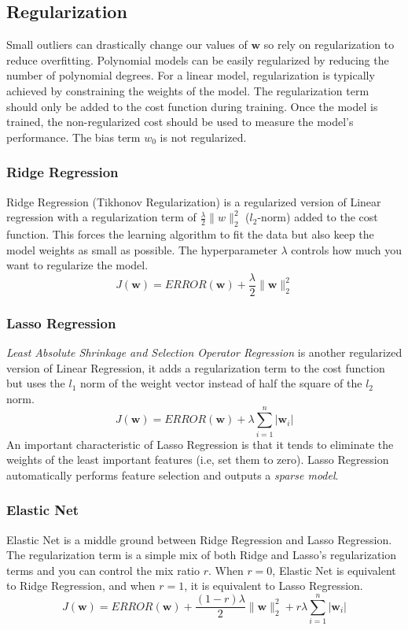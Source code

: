 \documentclass[12pt]{article}
\begin{document}
    \subsection{Regularization}
        Small outliers can drastically change our values of $\boldsymbol{w}$ so rely on regularization to reduce overfitting. Polynomial models can be easily regularized
        by reducing the number of polynomial degrees. For a linear model, regularization is typically achieved by constraining the weights of the model. The regularization term should only
        be added to the cost function during training. Once the model is trained, the non-regularized cost should be used to measure the model's performance. The bias term $w_0$ is not regularized.

        \subsubsection{Ridge Regression}
            Ridge Regression (Tikhonov Regularization) is a regularized version of Linear regression with a regularization term of $\frac{\lambda}{2}\|w\|_2^2$ ($l_2$-norm) added to the cost function.
            This forces the learning algorithm to fit the data but also keep the model weights as small as possible. The hyperparameter $\lambda$ controls how much you want to regularize the model.
            $$ J(\boldsymbol{w}) = ERROR(\boldsymbol{w}) + \frac{\lambda}{2}\|\boldsymbol{w}\|^2_2 $$

        \subsubsection{Lasso Regression}
            \textit{Least Absolute Shrinkage and Selection Operator Regression} is another regularized version of Linear Regression, it adds a regularization term to the cost function
            but uses the $l_1$ norm of the weight vector instead of half the square of the $l_2$ norm.
            $$ J(\boldsymbol{w}) = ERROR(\boldsymbol{w}) + \lambda\sum_{i=1}^n|\boldsymbol{w}_i| $$
            An important characteristic of Lasso Regression is that it tends to eliminate the weights of the least important features (i.e, set them to zero). Lasso Regression automatically performs 
            feature selection and outputs a \textit{sparse model}.

        \subsubsection{Elastic Net}
            Elastic Net is a middle ground between Ridge Regression and Lasso Regression. The regularization term is a simple mix of both Ridge and Lasso's regularization terms and you can control the mix
            ratio $r$. When $r = 0$, Elastic Net is equivalent to Ridge Regression, and when $r = 1$, it is equivalent to Lasso Regression.
            $$ J(\boldsymbol{w}) = ERROR(\boldsymbol{w}) + \frac{(1-r)\lambda}{2}\|\boldsymbol{w}\|^2_2 +  r\lambda\sum_{i=1}^n|\boldsymbol{w}_i| $$
        
\end{document}
